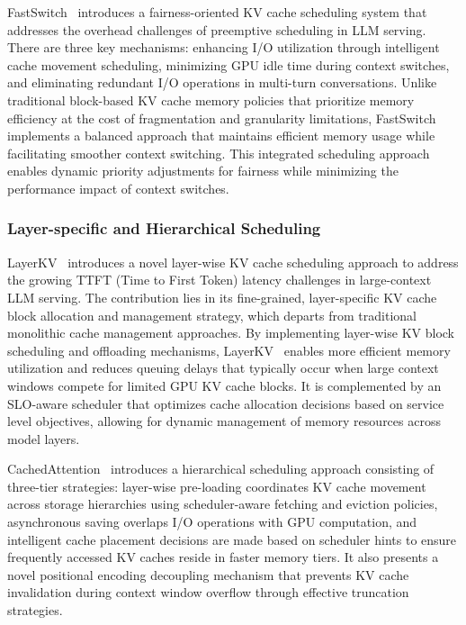 FastSwitch~\cite{shen2024fastswitchoptimizingcontextswitching} introduces a fairness-oriented KV cache scheduling system that addresses the overhead challenges of preemptive scheduling in LLM serving. There are three key mechanisms: enhancing I/O utilization through intelligent cache movement scheduling, minimizing GPU idle time during context switches, and eliminating redundant I/O operations in multi-turn conversations. Unlike traditional block-based KV cache memory policies that prioritize memory efficiency at the cost of fragmentation and granularity limitations, FastSwitch~\cite{shen2024fastswitchoptimizingcontextswitching} implements a balanced approach that maintains efficient memory usage while facilitating smoother context switching. This integrated scheduling approach enables dynamic priority adjustments for fairness while minimizing the performance impact of context switches.

\subsubsection{Layer-specific and Hierarchical Scheduling}\label{sec:sys_sch_lhs}

LayerKV~\cite{xiong2024layerkvoptimizinglargelanguage} introduces a novel layer-wise KV cache scheduling approach to address the growing TTFT (Time to First Token) latency challenges in large-context LLM serving. The contribution lies in its fine-grained, layer-specific KV cache block allocation and management strategy, which departs from traditional monolithic cache management approaches. By implementing layer-wise KV block scheduling and offloading mechanisms, LayerKV~\cite{xiong2024layerkvoptimizinglargelanguage} enables more efficient memory utilization and reduces queuing delays that typically occur when large context windows compete for limited GPU KV cache blocks. It is complemented by an SLO-aware scheduler that optimizes cache allocation decisions based on service level objectives, allowing for dynamic management of memory resources across model layers. 


CachedAttention~\cite{gao2024costefficientlargelanguagemodel} introduces a hierarchical scheduling approach consisting of three-tier strategies: layer-wise pre-loading coordinates KV cache movement across storage hierarchies using scheduler-aware fetching and eviction policies, asynchronous saving overlaps I/O operations with GPU computation, and intelligent cache placement decisions are made based on scheduler hints to ensure frequently accessed KV caches reside in faster memory tiers. It also presents a novel positional encoding decoupling mechanism that prevents KV cache invalidation during context window overflow through effective truncation strategies. 



